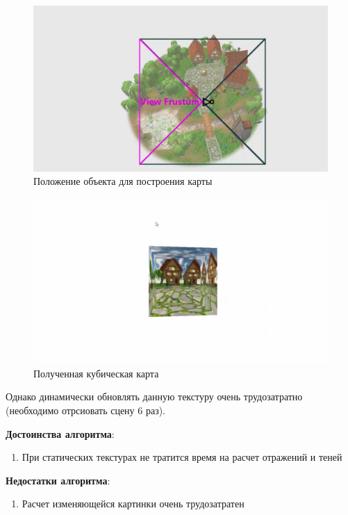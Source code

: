 \documentclass[a4paper,14pt, unknownkeysallowed]{extreport}
\begin{document}
\begin{figure}[H]
	\centering
	\includegraphics[scale=0.4]{cube_maps_real}
	\caption{Положение объекта для построения карты}
	\label{fig:cube_maps_real}
\end{figure}


\begin{figure}[H]
	\centering
	\includegraphics[scale=0.4]{cube_maps_real_example}
	\caption{Полученная кубическая карта}
	\label{fig:cube_maps_real_example}
\end{figure}


Однако динамически обновлять данную текстуру очень трудозатратно (необходимо отрсиовать сцену 6 раз).


\textbf{Достоинства алгоритма}:
\begin{enumerate}
	\item При статических текстурах не тратится время на расчет отражений и теней
\end{enumerate}

\textbf{Недостатки алгоритма}:
\begin{enumerate}
	\item Расчет изменяющейся картинки очень трудозатратен
\end{enumerate}
\end{document}
